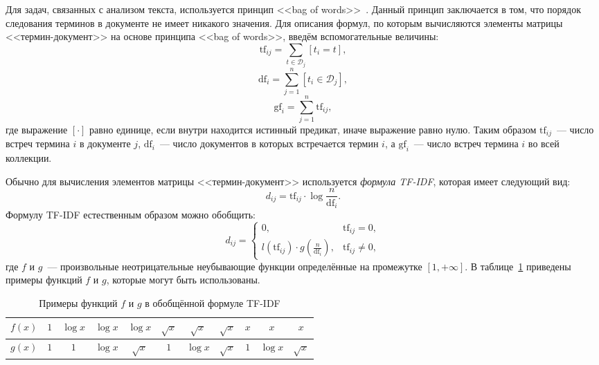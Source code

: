 Для задач, связанных с анализом текста, используется принцип
<<bag of words>>~\cite{manning2008introduction2}. Данный принцип
заключается в том, что порядок следования терминов в документе
не имеет никакого значения. Для описания формул, по которым вычисляются 
элементы матрицы <<термин-документ>> на основе принципа <<bag of words>>,
введём вспомогательные величины:
\[
    \mathrm{tf}_{ij} = \sum_{t \in \mathcal{D}_j} [t_i = t],
\]
\[
    \mathrm{df}_{i} = \sum_{j=1}^{n} [t_i \in \mathcal{D}_j],
\]
\[
    \mathrm{gf}_{i} = \sum_{j=1}^{n} \mathrm{tf}_{ij},
\]
где выражение $[\cdot]$ равно единице, если внутри находится истинный
предикат, иначе выражение равно нулю. Таким образом $\mathrm{tf}_{ij}$~---
число встреч термина $i$ в документе $j$, $\mathrm{df}_{i}$~---
число документов в которых встречается термин $i$, а $\mathrm{gf}_{i}$~---
число встреч термина $i$ во всей коллекции.

Обычно для вычисления элементов матрицы <<термин-документ>> используется
\textit{формула TF-IDF}, которая имеет следующий вид:
\begin{equation}\label{eq:tf_idf}
    d_{ij} = \mathrm{tf}_{ij} \cdot \log{\frac{n}{\mathrm{df}_{i}}}.
\end{equation}
Формулу TF-IDF естественным образом можно обобщить:
\begin{equation}\label{eq:general_tfidf}
d_{ij} = \begin{cases}
    0,& \mathrm{tf}_{ij} = 0,\\
    l(\mathrm{tf}_{ij}) \cdot g(\frac{n}{\mathrm{df}_{i}}),& \mathrm{tf}_{ij} \ne 0,
         \end{cases}
\end{equation}
где $f$ и $g$~--- произвольные неотрицательные неубывающие функции определённые
на промежутке $\left[1, +\infty \right]$. В
таблице~\ref{tab:f_g_examples} приведены примеры функций $f$ и $g$,
которые могут быть использованы.

\begin{table}[!h]
    \caption{Примеры функций $f$ и $g$ в обобщённой формуле TF-IDF}\label{tab:f_g_examples}
\centering
\begin{tabular}{|c|c|c|c|c|c|c|c|c|c|c|}\hline
    \boldmath$f(x)$ & $1$ & $\log{x}$ & $\log{x}$ & $\log{x}$ & $\sqrt{x}$ & $\sqrt{x}$ & $\sqrt{x}$ & $x$ & $x$ & $x$ \\\hline
    \boldmath$g(x)$ & $1$ & $1$ & $\log{x}$ & $\sqrt{x}$ & $1$ & $\log{x}$ & $\sqrt{x}$ & $1$ & $\log{x}$ & $\sqrt{x}$ \\\hline
\end{tabular}
\end{table}

